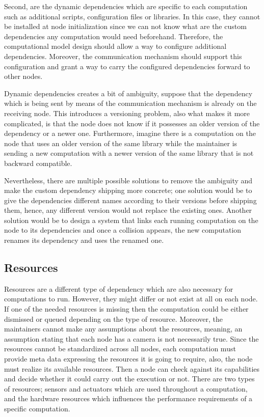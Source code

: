  Second, are the dynamic dependencies which are specific to each computation such as additional scripts, configuration files or libraries. In this case, they cannot be installed at node initialization since we can not know what are the custom dependencies any computation would need beforehand. Therefore, the computational model design should allow a way to configure additional dependencies. Moreover, the communication mechanism should support this configuration and grant a way to carry the configured dependencies forward to other nodes.
 
 
  Dynamic dependencies creates a bit of ambiguity, suppose that the dependency which is being sent by means of the communication mechanism is already on the receiving node. This introduces a  versioning problem, also what makes it more complicated, is that the node does not know if it possesses an older version of the dependency or a newer one. Furthermore,  imagine there is a computation on the node that uses an older version of the same library while the maintainer is sending a new computation with a newer version of the same library that is not backward compatible. 
  
   Nevertheless, there are multiple possible solutions to remove the ambiguity and make the custom dependency shipping more concrete; one solution would be to give the dependencies different names according to their versions before shipping them, hence, any different version would not replace the existing ones. Another solution would be to design a system that links each running computation on the node to its dependencies and once a collision appears, the new computation renames its dependency and uses the renamed one.
 

\subsection {Resources}


Resources are a different type of dependency which are also necessary for computations to run. However, they might differ or not exist at all on each node. If one of the needed resources is missing then the computation could be either dismissed or queued depending on the type of resource. Moreover, the maintainers cannot make any assumptions about the resources, meaning, an assumption stating that each node has a camera is not necessarily true. Since the resources cannot be standardized across all nodes, each computation must provide meta data expressing the resources it is going to require, also, the node must realize its available resources. Then a node can check against its capabilities and decide whether it could carry out the execution or not. There are two types of resources; sensors and actuators which are used throughout a computation, and the hardware resources which influences the performance requirements of a specific computation.


